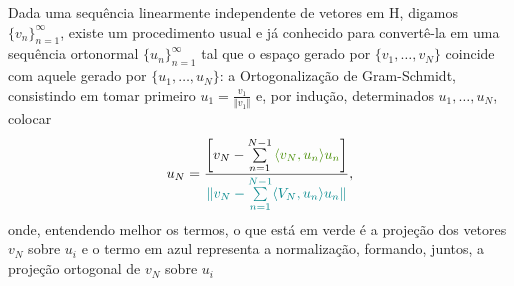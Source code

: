 \documentclass[../functional_analysis.tex]{subfiles}
\begin{document}
    Dada uma sequência linearmente independente de vetores em H, digamos \(\{v_{n}\}_{n=1}^{\infty}\), existe um procedimento usual e já conhecido para convertê-la em uma sequência ortonormal \(\{u_{n}\}_{n=1}^{\infty}\) tal que o espaço gerado por \(\{v_{1}, \dotsc , v_{N}\}\) coincide com aquele gerado por \(\{u_{1},\dotsc , u_{N}\}\): a \hypertarget{gram_schmidt}{Ortogonalização de Gram-Schmidt}, consistindo em tomar primeiro \(u_1 = \frac{v_1}{\Vert v_1 \Vert}\) e, por indução, determinados \(u_1,\dotsc ,u_{N}\), colocar 
      \[
        u_{N} = \frac{ \biggl[v_{N}-\sum\limits_{n=1}^{N-1}{\color{Chartreuse4}\langle v_{N}, u_{n} \rangle u_{n}}\biggr]}{{\color{Turquoise4}\Vert v_{N} -\sum\limits_{n=1}^{N-1}\langle V_{N}, u_{n} \rangle u_{n}\Vert}},
      \]
      onde, entendendo melhor os termos, o que está {\color{Chartreuse4}em verde é a projeção dos vetores \(v_{N}\) sobre \(u_{i}\)} e o termo {\color{Turquoise4}em azul representa a normalização}, formando, juntos, a projeção ortogonal de \(v_{N}\) sobre \(u_{i}\)
    
\end{document}
